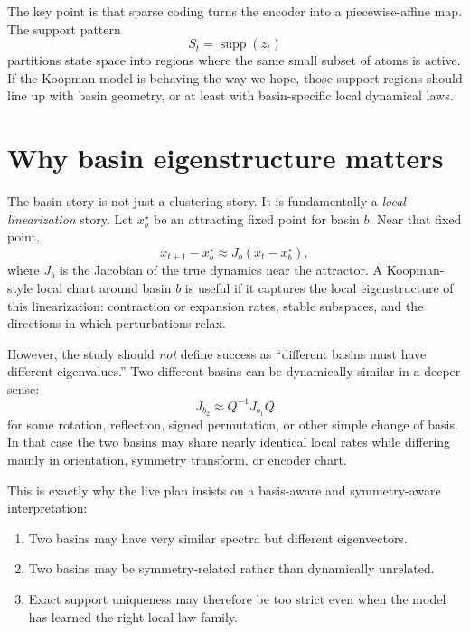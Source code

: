 \documentclass[11pt]{article}
\newcommand{\Supp}{\operatorname{supp}}
\begin{document}
The key point is that sparse coding turns the encoder into a piecewise-affine
map. The support pattern
\begin{equation}
    S_t = \Supp(z_t)
\end{equation}
partitions state space into regions where the same small subset of atoms is
active. If the Koopman model is behaving the way we hope, those support regions
should line up with basin geometry, or at least with basin-specific local
dynamical laws.

\section{Why basin eigenstructure matters}

The basin story is not just a clustering story. It is fundamentally a
\emph{local linearization} story. Let $x_b^\star$ be an attracting fixed point
for basin $b$. Near that fixed point,
\begin{equation}
    x_{t+1} - x_b^\star \approx J_b (x_t - x_b^\star),
\end{equation}
where $J_b$ is the Jacobian of the true dynamics near the attractor. A
Koopman-style local chart around basin $b$ is useful if it captures the local
eigenstructure of this linearization: contraction or expansion rates, stable
subspaces, and the directions in which perturbations relax.

However, the study should \emph{not} define success as ``different basins must
have different eigenvalues.'' Two different basins can be dynamically similar
in a deeper sense:
\begin{equation}
    J_{b_2} \approx Q^{-1} J_{b_1} Q
\end{equation}
for some rotation, reflection, signed permutation, or other simple change of
basis. In that case the two basins may share nearly identical local rates while
differing mainly in orientation, symmetry transform, or encoder chart.

This is exactly why the live plan insists on a basis-aware and
symmetry-aware interpretation:
\begin{enumerate}[leftmargin=1.5em]
    \item Two basins may have very similar spectra but different eigenvectors.
    \item Two basins may be symmetry-related rather than dynamically unrelated.
    \item Exact support uniqueness may therefore be too strict even when the
    model has learned the right local law family.
\end{enumerate}
\end{document}
